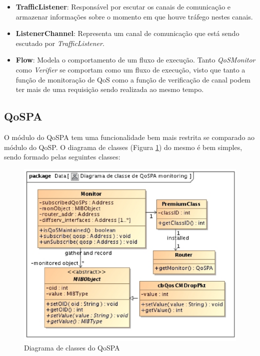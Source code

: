 \begin{itemize}
\item \textbf{TrafficListener}: Responsável por escutar os canais de comunicação e armazenar informações sobre o momento em que houve tráfego nestes canais.

\item \textbf{ListenerChannel}: Representa um canal de comunicação que está sendo escutado por \textit{TrafficListener}.

\item \textbf{Flow}: Modela o comportamento de um fluxo de execução. Tanto \textit{QoSMonitor} como \textit{Verifier} se comportam como um fluxo de execução, visto que tanto a função de monitoração de QoS como a função de verificação de canal podem ter mais de uma requisição sendo realizada ao mesmo tempo.

\end{itemize}

\subsection{QoSPA}

	O módulo do QoSPA tem uma funcionalidade bem mais restrita se comparado ao módulo do QoSP. O diagrama de classes (Figura \ref{fig:diagrama_classe_qospa}) do mesmo é bem simples, sendo formado pelas seguintes classes:
	
\begin{figure}
\centering
\includegraphics[scale=0.7]{diagrama_qospa}
\caption{Diagrama de classes do QoSPA}
\label{fig:diagrama_classe_qospa}
\end{figure}

